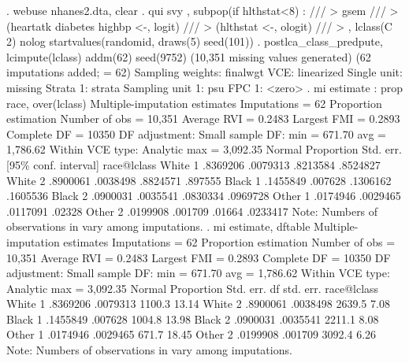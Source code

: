 . webuse nhanes2.dta, clear
{\smallskip}
. qui svy , subpop(if hlthstat<8) : ///
>         gsem ///
>                 (heartatk diabetes highbp <-, logit) ///
>                 (hlthstat <-, ologit) /// 
>         , lclass(C 2) nolog  startvalues(randomid, draws(5) seed(101)) 
{\smallskip}
. postlca_class_predpute, lcimpute(lclass) addm(62) seed(9752)
(10,351 missing values generated)
(62 imputations added; {} = 62)
{\smallskip}
Sampling weights: finalwgt
             VCE: linearized
     Single unit: missing
        Strata 1: strata
 Sampling unit 1: psu
           FPC 1: <zero>
{\smallskip}
. mi estimate : prop race, over(lclass) 
{\smallskip}
Multiple-imputation estimates     Imputations     =         62
Proportion estimation             Number of obs   =     10,351
                                  Average RVI     =     0.2483
                                  Largest FMI     =     0.2893
                                  Complete DF     =      10350
DF adjustment:   Small sample     DF:     min     =     671.70
                                          avg     =   1,786.62
Within VCE type:     Analytic             max     =   3,092.35
{\smallskip}
             {\VBAR}                                   Normal
             {\VBAR} Proportion   Std. err.     [95\% conf. interval]
 race@lclass {\VBAR}
    White 1  {\VBAR}   .8369206   .0079313      .8213584    .8524827
    White 2  {\VBAR}   .8900061   .0038498      .8824571     .897555
    Black 1  {\VBAR}   .1455849    .007628      .1306162    .1605536
    Black 2  {\VBAR}   .0900031   .0035541      .0830334    .0969728
    Other 1  {\VBAR}   .0174946   .0029465      .0117091      .02328
    Other 2  {\VBAR}   .0199908    .001709        .01664    .0233417
Note: Numbers of observations in {} vary among imputations.
{\smallskip}
. mi estimate, dftable
{\smallskip}
Multiple-imputation estimates     Imputations     =         62
Proportion estimation             Number of obs   =     10,351
                                  Average RVI     =     0.2483
                                  Largest FMI     =     0.2893
                                  Complete DF     =      10350
DF adjustment:   Small sample     DF:     min     =     671.70
                                          avg     =   1,786.62
Within VCE type:     Analytic             max     =   3,092.35
{\smallskip}
             {\VBAR}                                          Normal
             {\VBAR} Proportion   Std. err.           df   std. err.
 race@lclass {\VBAR}
    White 1  {\VBAR}   .8369206   .0079313        1100.3       13.14
    White 2  {\VBAR}   .8900061   .0038498        2639.5        7.08
    Black 1  {\VBAR}   .1455849    .007628        1004.8       13.98
    Black 2  {\VBAR}   .0900031   .0035541        2211.1        8.08
    Other 1  {\VBAR}   .0174946   .0029465         671.7       18.45
    Other 2  {\VBAR}   .0199908    .001709        3092.4        6.26
Note: Numbers of observations in {} vary among imputations.
